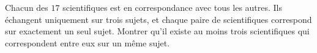 Chacun des $17$ scientifiques est en correspondance avec tous les autres.
Ils échangent uniquement sur trois sujets, et chaque paire de scientifiques
correspond sur exactement un seul sujet. Montrer qu'il existe au moins trois
scientifiques qui correspondent entre eux sur un même sujet.
